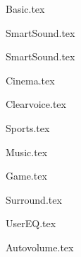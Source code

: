 {Basic.tex}

{SmartSound.tex}

{SmartSound.tex}

{Cinema.tex}

{Clearvoice.tex}

{Sports.tex}

{Music.tex}

{Game.tex}

{Surround.tex}


{UserEQ.tex}

{Autovolume.tex}




